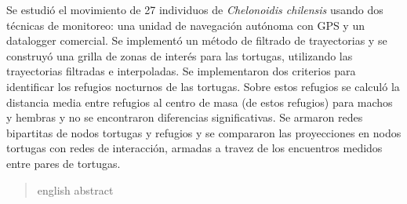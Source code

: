 \begin{resumen}%
    Se estudió el movimiento de 27 individuos de \textit{Chelonoidis chilensis} usando dos técnicas de monitoreo: una unidad de navegación  autónoma con GPS y un datalogger comercial. Se implementó un método de filtrado de trayectorias y se construyó una grilla de zonas de interés para las tortugas, utilizando las trayectorias filtradas e interpoladas. Se implementaron dos criterios para identificar los refugios nocturnos de las tortugas. Sobre estos refugios se calculó la distancia media entre refugios al centro de masa (de estos refugios) para machos y hembras y no se encontraron diferencias significativas. Se armaron redes bipartitas de nodos tortugas y refugios y se compararon las proyecciones en nodos tortugas con redes de interacción, armadas a travez de los encuentros medidos entre pares de tortugas. 
\end{resumen}

\begin{abstract}%
english abstract
\end{abstract}


